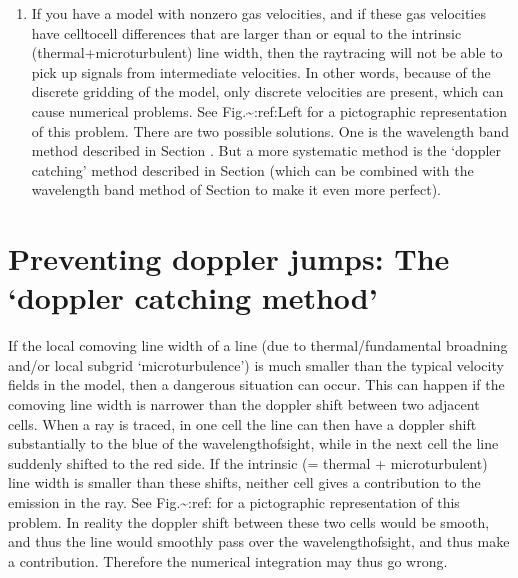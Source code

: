 \documentclass[letterpaper,10pt,english]{sphinxmanual}
\begin{document}
\begin{enumerate}
\item {} 
If you have a model with non\sphinxhyphen{}zero gas velocities, and if these gas
velocities have cell\sphinxhyphen{}to\sphinxhyphen{}cell differences that are larger than or equal to
the intrinsic (thermal+microturbulent) line width, then the ray\sphinxhyphen{}tracing
will not be able to pick up signals from intermediate velocities. In other
words, because of the discrete gridding of the model, only discrete
velocities are present, which can cause numerical problems. See
Fig.\textasciitilde{}:ref:\sphinxhyphen{}Left for a pictographic representation of
this problem. There are two possible solutions. One is the wavelength band
method described in Section {\hyperref[\detokenize{imagesspectra:sec-wavelength-bands}]{}}.  But a more
systematic method is the ‘doppler catching’ method described in Section
{\hyperref[\detokenize{lineradtrans:sec-doppler-catching}]{}} (which can be combined with the wavelength band
method of Section {\hyperref[\detokenize{imagesspectra:sec-wavelength-bands}]{}} to make it even more
perfect).

\end{enumerate}


\section{Preventing doppler jumps: The ‘doppler catching method’}
\label{\detokenize{lineradtrans:preventing-doppler-jumps-the-doppler-catching-method}}\label{\detokenize{lineradtrans:sec-doppler-catching}}
If the local co\sphinxhyphen{}moving line width of a line (due to thermal/fundamental
broadning and/or local subgrid ‘microturbulence’) is much smaller than the
typical velocity fields in the model, then a dangerous situation can
occur. This can happen if the co\sphinxhyphen{}moving line width is narrower than the
doppler shift between two adjacent cells. When a ray is traced, in one cell
the line can then have a doppler shift substantially to the blue of the
wavelength\sphinxhyphen{}of\sphinxhyphen{}sight, while in the next cell the line suddenly shifted to the
red side. If the intrinsic (= thermal + microturbulent) line width is
smaller than these shifts, neither cell gives a contribution to the emission
in the ray. See Fig.\textasciitilde{}:ref: for a pictographic
representation of this problem. In reality the doppler shift between these
two cells would be smooth, and thus the line would smoothly pass over the
wavelength\sphinxhyphen{}of\sphinxhyphen{}sight, and thus make a contribution. Therefore the numerical
integration may thus go wrong.
\end{document}
